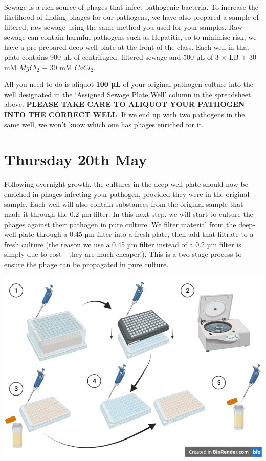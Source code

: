 \documentclass[
]{book}
\begin{document}
Sewage is a rich source of phages that infect pathogenic bacteria. To increase the likelihood of finding phages for our pathogens, we have also prepared a sample of filtered, raw sewage using the same method you used for your samples. Raw sewage can contain harmful pathogens such as Hepatitis, so to minimise risk, we have a pre-prepared deep well plate at the front of the class. Each well in that plate contains 900 µL of centrifuged, filtered sewage and 500 µL of 3 \(\times\) LB + 30 mM \(MgCl_{2}\) + 30 mM \(CaCl_{2}\).

All you need to do is aliquot \textbf{100 µL} of your original pathogen culture into the well designated in the `Assigned Sewage Plate Well' column in the spreadsheet above. \textbf{PLEASE TAKE CARE TO ALIQUOT YOUR PATHOGEN INTO THE CORRECT WELL}. If we end up with two pathogens in the same well, we won't know which one has phages enriched for it.

\hypertarget{thursday-20th-may}{%
\section{Thursday 20th May}\label{thursday-20th-may}}

Following overnight growth, the cultures in the deep-well plate should now be enriched in phages infecting your pathogen, provided they were in the original sample. Each well will also contain substances from the original sample that made it through the 0.2 µm filter. In this next step, we will start to culture the phages against their pathogen in pure culture. We filter material from the deep-well plate through a 0.45 µm filter into a fresh plate, then add that filtrate to a fresh culture (the reason we use a 0.45 µm filter instead of a 0.2 µm filter is simply due to cost - they are much cheaper!). This is a two-stage process to ensure the phage can be propagated in pure culture.

\includegraphics{images/first-filtration.png}
\end{document}

